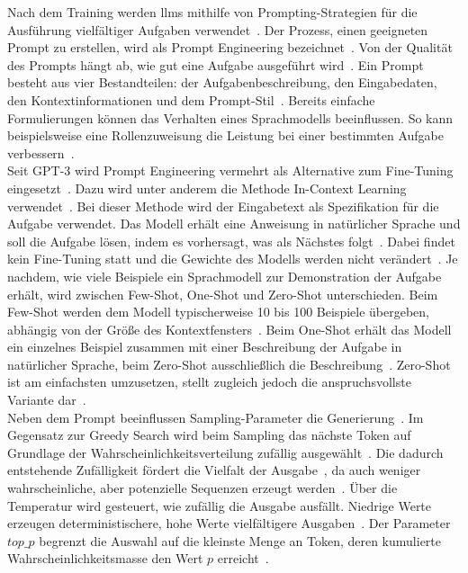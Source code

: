Nach dem Training werden \acp{llm} mithilfe von Prompting-Strategien für die Ausführung vielfältiger Aufgaben verwendet~\cite[44]{llm09}. Der Prozess, einen geeigneten 
Prompt zu erstellen, wird als Prompt Engineering bezeichnet~\cite[44]{llm09}. Von der Qualität des Prompts hängt ab, wie gut eine Aufgabe ausgeführt wird~\cite[44]{llm09}.
Ein Prompt besteht aus vier Bestandteilen: der Aufgabenbeschreibung, den Eingabedaten, den Kontextinformationen und dem Prompt-Stil~\cite[44]{llm09}. Bereits einfache
Formulierungen können das Verhalten eines Sprachmodells beeinflussen. So kann beispielsweise eine Rollenzuweisung die Leistung bei einer bestimmten Aufgabe
verbessern~\cite[45]{llm09}. \\
Seit GPT-3 wird Prompt Engineering vermehrt als Alternative zum Fine-Tuning eingesetzt~\cite[2968]{cb01}. Dazu wird unter anderem die Methode In-Context Learning
verwendet~\cite[4]{llm07}. Bei dieser Methode wird der Eingabetext als Spezifikation für die Aufgabe verwendet. Das Modell erhält eine Anweisung in natürlicher
Sprache und soll die Aufgabe lösen, indem es vorhersagt, was als Nächstes folgt~\cite[4]{llm07}. Dabei findet kein Fine-Tuning statt und die Gewichte des Modells
werden nicht verändert~\cite[5]{llm07}. Je nachdem, wie viele Beispiele ein Sprachmodell zur Demonstration der Aufgabe erhält, wird zwischen Few-Shot, One-Shot und
Zero-Shot unterschieden. Beim Few-Shot werden dem Modell typischerweise 10 bis 100 Beispiele übergeben, abhängig von der Größe des Kontextfensters~\cite[6]{llm07}.
Beim One-Shot erhält das Modell ein einzelnes Beispiel zusammen mit einer Beschreibung der Aufgabe in natürlicher Sprache, beim Zero-Shot ausschließlich die
Beschreibung~\cite[6\psq]{llm07}. Zero-Shot ist am einfachsten umzusetzen, stellt zugleich jedoch die anspruchsvollste Variante dar~\cite[7]{llm07}. \\
Neben dem Prompt beeinflussen Sampling-Parameter die Generierung~\cite[26]{llm09}. Im Gegensatz zur Greedy Search wird beim Sampling das nächste Token auf Grundlage
der Wahrscheinlichkeitsverteilung zufällig ausgewählt~\cite[26]{llm09}. Die dadurch entstehende Zufälligkeit fördert die Vielfalt der Ausgabe~\cite[26]{llm09}, da
auch weniger wahrscheinliche, aber potenzielle Sequenzen erzeugt werden~\cite[2996]{cb01}. Über die Temperatur wird gesteuert, wie zufällig die Ausgabe ausfällt. 
Niedrige Werte erzeugen deterministischere, hohe Werte vielfältigere Ausgaben~\cite{llm10}. Der Parameter $top\_p$ begrenzt die Auswahl auf die kleinste Menge 
an Token, deren kumulierte Wahrscheinlichkeitsmasse den Wert $p$ erreicht~\cite{llm10}.


